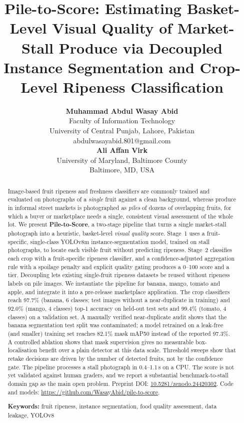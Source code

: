 \documentclass[10pt,twocolumn]{article}
\title{\textbf{Pile-to-Score: Estimating Basket-Level Visual Quality of Market-Stall Produce via Decoupled Instance Segmentation and Crop-Level Ripeness Classification}}
\author{%
\begin{tabular}[t]{c}
\small\textbf{Muhammad Abdul Wasay Abid}\\[1pt]
\footnotesize Faculty of Information Technology\\
\footnotesize University of Central Punjab, Lahore, Pakistan\\
\footnotesize abdulwasayabid.801@gmail.com
\end{tabular}
\hspace{2.5em}
\begin{tabular}[t]{c}
\small\textbf{Ali Affan Virk}\\[1pt]
\footnotesize University of Maryland, Baltimore County\\
\footnotesize Baltimore, MD, USA
\end{tabular}}
\date{\vspace{-12pt}}
\begin{document}
\maketitle
\begin{abstract}
Image-based fruit ripeness and freshness classifiers are commonly trained and evaluated on photographs of a \emph{single} fruit against a clean background, whereas produce in informal street markets is photographed as \emph{piles} of dozens of overlapping fruits, for which a buyer or marketplace needs a single, consistent visual assessment of the whole lot. We present \textbf{Pile-to-Score}, a two-stage pipeline that turns a single market-stall photograph into a heuristic, basket-level \emph{visual quality} score. Stage~1 uses a fruit-specific, single-class YOLOv8m instance-segmentation model, trained on stall photographs, to locate each visible fruit without predicting ripeness. Stage~2 classifies each crop with a fruit-specific ripeness classifier, and a confidence-adjusted aggregation rule with a spoilage penalty and explicit quality gating produces a 0--100 score and a tier. Decoupling lets existing single-fruit ripeness datasets be reused without ripeness labels on pile images. We instantiate the pipeline for banana, mango, tomato and apple, and integrate it into a pre-release marketplace application. The crop classifiers reach 97.7\% (banana, 6 classes; test images without a near-duplicate in training) and 92.0\% (mango, 4 classes) top-1 accuracy on held-out test sets and 99.4\% (tomato, 4 classes) on a validation set. A manually verified near-duplicate audit shows that the banana segmentation test split was contaminated; a model retrained on a leak-free (and smaller) training set reaches 82.1\% mask mAP50 instead of the reported 97.3\%. A controlled ablation shows that mask supervision gives no measurable box-localisation benefit over a plain detector at this data scale. Threshold sweeps show that retake decisions are driven by the number of detected fruits, not by the confidence gate. The pipeline processes a stall photograph in 0.4--1.1\,s on a CPU. The score is not yet validated against human graders, and we report a substantial benchmark-to-stall domain gap as the main open problem. Preprint DOI: \href{https://doi.org/10.5281/zenodo.24420302}{10.5281/zenodo.24420302}. Code and models: \url{https://github.com/WasayAbid/pile-to-score}.

\vspace{4pt}\noindent\parbox{\linewidth}{\textbf{Keywords:} fruit ripeness, instance segmentation, food quality assessment, data leakage, YOLOv8}
\end{abstract}
\end{document}
